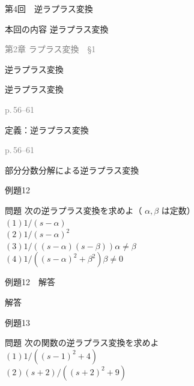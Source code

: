 \documentclass[aspectratio=43,professionalfonts,handout]{beamer}
\begin{document}
\begin{frame}{第4回　逆ラプラス変換}
  \begin{block}{本回の内容}
  逆ラプラス変換
  \end{block}
  \vfill\hfill{\scriptsize \textcolor{gray}{第2章 ラプラス変換　§1}}
\end{frame}

\begin{frame}{逆ラプラス変換}
  \begin{block}{}
  {\large 逆ラプラス変換}
  \end{block}
  \vfill\hfill{\scriptsize \textcolor{gray}{p.\,56--61}}
\end{frame}

\begin{frame}{定義：逆ラプラス変換}
  \begin{block}{}
  \end{block}
  \vfill\hfill{\scriptsize \textcolor{gray}{p.\,56--61}}
\end{frame}

\begin{frame}{部分分数分解による逆ラプラス変換}
  \begin{block}{}
  \end{block}
\end{frame}

\begin{frame}{例題12}
  \begin{exampleblock}{問題}
    次の逆ラプラス変換を求めよ（ $\alpha, \beta$ は定数）\\[2pt]
    $(1) 1/(s-\alpha)$\\[2pt]
    $(2) 1/(s-\alpha)^{2}$\\[2pt]
    $(3) 1/((s-\alpha)(s-\beta))  \alpha \neq \beta$\\[2pt]
    $(4) 1/((s-\alpha)^{2}+\beta^{2})  \beta \neq 0$\\[2pt]
  \end{exampleblock}
\end{frame}

\begin{frame}{例題12　解答}
  \begin{exampleblock}{解答}
  \end{exampleblock}
\end{frame}

\begin{frame}{例題13}
  \begin{exampleblock}{問題}
    次の関数の逆ラプラス変換を求めよ\\[2pt]
    $(1) 1/((s-1)^{2}+4)$\\[2pt]
    $(2) (s+2)/((s+2)^{2}+9)$\\[2pt]
  \end{exampleblock}
\end{frame}
\end{document}
